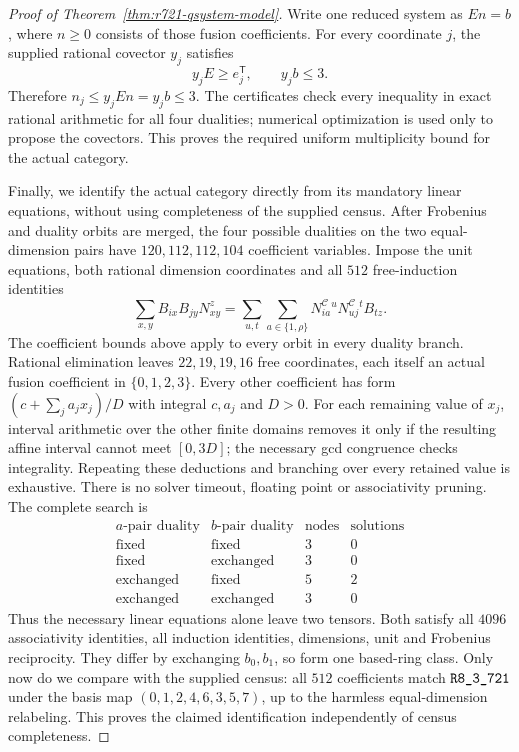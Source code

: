 \begin{proof}[Proof of Theorem~\ref{thm:r721-qsystem-model}]
Write one reduced system as $E n=b$, where $n\ge0$ consists of those fusion
coefficients. For every coordinate $j$, the supplied rational covector
$y_j$ satisfies
\[
 y_j E\ge e_j^{\mathsf T},\qquad y_j b\le3.
\]
Therefore $n_j\le y_j E n=y_j b\le3$. The certificates check every inequality
in exact rational arithmetic for all four dualities; numerical optimization
is used only to propose the covectors. This proves the required uniform
multiplicity bound for the actual category.

Finally, we identify the actual category directly from its mandatory
linear equations, without using completeness of the supplied census.
After Frobenius and duality orbits are merged, the four possible dualities
on the two equal-dimension pairs have $120,112,112,104$ coefficient
variables. Impose the unit equations, both rational dimension coordinates
and all $512$ free-induction identities
\[
 \sum_{x,y}B_{ix}B_{jy}N_{xy}^z
 =\sum_{u,t}\sum_{a\in\{1,\rho\}}
        N^{\mathcal C}_{ia}{}^uN^{\mathcal C}_{uj}{}^tB_{tz}.
\]
The coefficient bounds above apply to every orbit in every duality branch.
Rational elimination leaves $22,19,19,16$ free coordinates, each itself
an actual fusion coefficient in $\{0,1,2,3\}$. Every other coefficient has
form $(c+\sum_j a_jx_j)/D$ with integral $c,a_j$ and $D>0$.
For each remaining value of $x_j$, interval arithmetic over the other
finite domains removes it only if the resulting affine interval cannot
meet $[0,3D]$; the necessary gcd congruence checks integrality. Repeating
these deductions and branching over every retained value is exhaustive.
There is no solver timeout, floating point or associativity pruning.
The complete search is
\[
\begin{array}{cc|rr}
 a\text{-pair duality}&b\text{-pair duality}&\text{nodes}&\text{solutions}\\\hline
 \text{fixed}&\text{fixed}&3&0\\
 \text{fixed}&\text{exchanged}&3&0\\
 \text{exchanged}&\text{fixed}&5&2\\
 \text{exchanged}&\text{exchanged}&3&0
\end{array}
\]
Thus the necessary linear equations alone leave two tensors. Both satisfy
all $4096$ associativity identities, all induction identities, dimensions,
unit and Frobenius reciprocity. They differ by exchanging $b_0,b_1$, so
form one based-ring class. Only now do we compare with the supplied census:
all $512$ coefficients match $\sha{R8_3_721}$ under the basis map
$(0,1,2,4,6,3,5,7)$, up to the harmless equal-dimension relabeling.
This proves the claimed identification independently of census completeness.
\end{proof}

